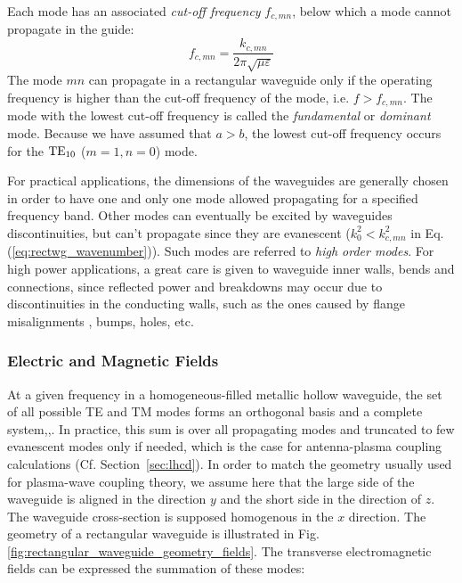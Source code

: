 Each mode has an associated \textit{cut-off frequency} $f_{c,mn}$, below which a mode cannot propagate in the guide:
\begin{equation}
	f_{c,mn} = \frac{k_{c,mn}}{2\pi\sqrt{\mu \varepsilon}}
	\label{eq:rectwg_cutoff-frequency}
\end{equation}
The mode $mn$ can propagate in a rectangular waveguide only if the operating frequency is higher than the cut-off frequency of the mode, i.e. $f>f_{c,mn}$. The mode with the lowest cut-off frequency is called the \textit{fundamental} or \textit{dominant} mode. Because we have assumed that $a>b$, the lowest cut-off frequency occurs for the ${\mathrm{TE}}_{10}$ ($m=1,n=0$) mode. 

For practical applications, the dimensions of the waveguides are generally chosen in order to have one and only one mode allowed propagating for a specified frequency band. Other modes can eventually be excited by waveguides discontinuities, but can’t propagate since they are evanescent ($k^2_0 < k_{c,mn}^2$ in Eq.(\ref{eq:rectwg_wavenumber})). Such modes are referred to \textit{high order modes}. For high power applications, a great care is given to waveguide inner walls, bends and connections, since reflected power and breakdowns may occur due to discontinuities in the conducting walls, such as the ones caused by flange misalignments , bumps, holes, etc.

\subsubsection{Electric and Magnetic Fields}
At a given frequency in a homogeneous-filled metallic hollow waveguide, the set of all possible TE and TM modes forms an orthogonal basis and a complete system\cite[§1.2]{marcuvitz1951},\cite[§5.2]{Collin1990},\cite[§8.2]{Harrington2001}. In practice, this sum is over all propagating modes and truncated to few evanescent modes only if needed, which is the case for antenna-plasma coupling calculations (Cf. Section~\ref{sec:lhcd}). In order to match the geometry usually used for plasma-wave coupling theory, we assume here that the large side of the waveguide is aligned in the direction $y$ and the short side in the direction of $z$. The waveguide cross-section is supposed homogenous in the $x$ direction. The geometry of a rectangular waveguide is illustrated in Fig.\ref{fig:rectangular_waveguide_geometry_fields}. The transverse electromagnetic fields can be expressed the summation of these modes:

